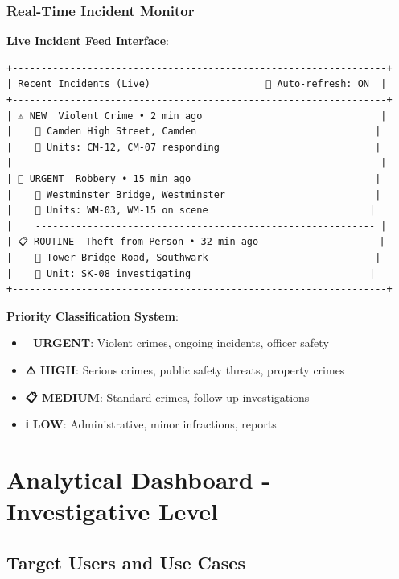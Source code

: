 \documentclass[12pt,a4paper]{article}
\begin{document}
\subsubsection{Real-Time Incident Monitor}

\textbf{Live Incident Feed Interface}:
\begin{verbatim}
+-----------------------------------------------------------------+
| Recent Incidents (Live)                    🔄 Auto-refresh: ON  |
+-----------------------------------------------------------------+
| ⚠️ NEW  Violent Crime • 2 min ago                               |
|    📍 Camden High Street, Camden                               |
|    👮 Units: CM-12, CM-07 responding                           |
|    ----------------------------------------------------------- |
| 🚨 URGENT  Robbery • 15 min ago                                |
|    📍 Westminster Bridge, Westminster                          |
|    👮 Units: WM-03, WM-15 on scene                            |
|    ----------------------------------------------------------- |
| 📋 ROUTINE  Theft from Person • 32 min ago                     |
|    📍 Tower Bridge Road, Southwark                             |
|    👮 Unit: SK-08 investigating                               |
+-----------------------------------------------------------------+
\end{verbatim}

\textbf{Priority Classification System}:
\begin{itemize}
    \item \textbf{🚨 URGENT}: Violent crimes, ongoing incidents, officer safety
    \item \textbf{⚠️ HIGH}: Serious crimes, public safety threats, property crimes
    \item \textbf{📋 MEDIUM}: Standard crimes, follow-up investigations
    \item \textbf{ℹ️ LOW}: Administrative, minor infractions, reports
\end{itemize}

\section{Analytical Dashboard - Investigative Level}

\subsection{Target Users and Use Cases}
\end{document}
